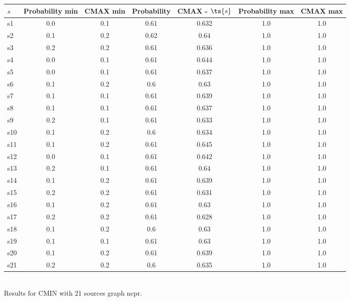 \documentclass{article}
\begin{document}
\noindent\begin{tabular}{|l|c|c|c|c|c|c|}
\hline
$s$& Probability min & CMAX min & Probability & CMAX - $\ts{s}$ & Probability max & CMAX max\\
\hline
s1 &0.0 & 0.1 & 0.61 & 0.632 & 1.0 & 1.0\\
\hline
s2 &0.1 & 0.2 & 0.62 & 0.64 & 1.0 & 1.0\\
\hline
s3 &0.2 & 0.2 & 0.61 & 0.636 & 1.0 & 1.0\\
\hline
s4 &0.0 & 0.1 & 0.61 & 0.644 & 1.0 & 1.0\\
\hline
s5 &0.0 & 0.1 & 0.61 & 0.637 & 1.0 & 1.0\\
\hline
s6 &0.1 & 0.2 & 0.6 & 0.63 & 1.0 & 1.0\\
\hline
s7 &0.1 & 0.1 & 0.61 & 0.639 & 1.0 & 1.0\\
\hline
s8 &0.1 & 0.1 & 0.61 & 0.637 & 1.0 & 1.0\\
\hline
s9 &0.2 & 0.1 & 0.61 & 0.633 & 1.0 & 1.0\\
\hline
s10 &0.1 & 0.2 & 0.6 & 0.634 & 1.0 & 1.0\\
\hline
s11 &0.1 & 0.2 & 0.61 & 0.645 & 1.0 & 1.0\\
\hline
s12 &0.0 & 0.1 & 0.61 & 0.642 & 1.0 & 1.0\\
\hline
s13 &0.2 & 0.1 & 0.61 & 0.64 & 1.0 & 1.0\\
\hline
s14 &0.1 & 0.2 & 0.61 & 0.639 & 1.0 & 1.0\\
\hline
s15 &0.2 & 0.2 & 0.61 & 0.631 & 1.0 & 1.0\\
\hline
s16 &0.1 & 0.2 & 0.61 & 0.63 & 1.0 & 1.0\\
\hline
s17 &0.2 & 0.2 & 0.61 & 0.628 & 1.0 & 1.0\\
\hline
s18 &0.1 & 0.2 & 0.6 & 0.63 & 1.0 & 1.0\\
\hline
s19 &0.1 & 0.1 & 0.61 & 0.63 & 1.0 & 1.0\\
\hline
s20 &0.1 & 0.2 & 0.61 & 0.639 & 1.0 & 1.0\\
\hline
s21 &0.2 & 0.2 & 0.6 & 0.635 & 1.0 & 1.0\\
\hline
\end{tabular}\\

\noindent Results for CMIN with 21 sources graph ncpr.
\end{document}
